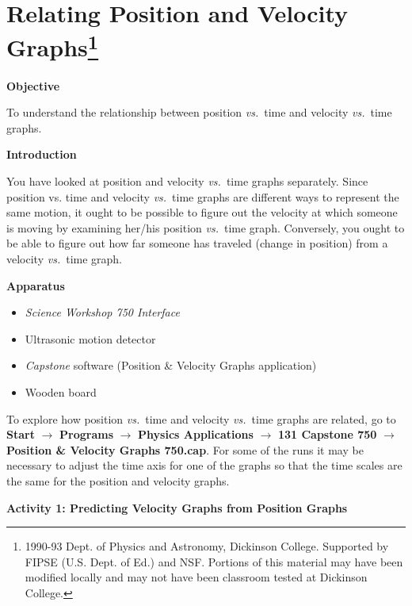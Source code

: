 
\section{Relating Position and Velocity Graphs\footnote{
1990-93 Dept. of Physics and Astronomy, Dickinson College. Supported by FIPSE
(U.S. Dept. of Ed.) and NSF. Portions of this material may have been modified
locally and may not have been classroom tested at Dickinson College.
}}

\makelabheader %

\textbf{Objective }

To understand the relationship between position \textit{vs.}~time and velocity \textit{vs.}~time
graphs.

\textbf{Introduction} 

You have looked at position and velocity \textit{vs.}~time graphs separately. Since position
vs. time and velocity \textit{vs.}~time graphs are different ways to represent the same
motion, it ought to be possible to figure out the velocity at which someone
is moving by examining her/his position \textit{vs.}~time graph. Conversely, you ought
to be able to figure out how far someone has traveled (change in position) from
a velocity \textit{vs.}~time graph.
\vspace{5mm}

\textbf{Apparatus} 

\begin{itemize}
\item \textit{Science Workshop 750 Interface}
\item Ultrasonic motion detector 
\item \textit{Capstone} software (Position \& Velocity Graphs application)
\item Wooden board
\end{itemize}

To explore how position \textit{vs.}~time and velocity \textit{vs.}~time graphs are related, go to \textbf{Start} $\rightarrow$ \textbf{Programs} $\rightarrow$ \textbf{Physics Applications} $\rightarrow$ \textbf{131 Capstone 750} $\rightarrow$ \textbf{Position \& Velocity Graphs 750.cap}. For some of the runs it may be necessary to adjust the time axis for one of the graphs so that the time scales are the same for the position and velocity graphs.
\vspace{5mm}

\textbf{Activity 1: Predicting Velocity Graphs from Position Graphs} 

